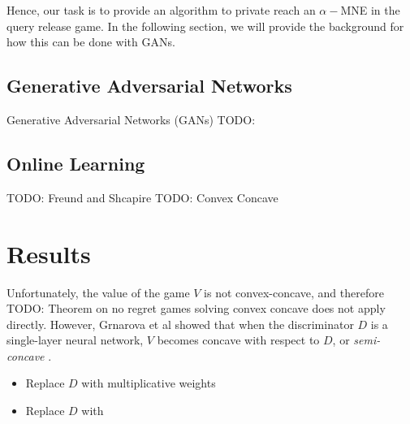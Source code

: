 \documentclass[]{article}
\newcommand{\todo}[1]{}
\renewcommand{\todo}[1]{{\color{red} TODO: {#1}}}
\begin{document}
Hence, our task is to provide an algorithm to private reach an $\alpha-$MNE in the query release game. In the following section, we will provide the background for how this can be done with GANs.

\subsection{Generative Adversarial Networks}

Generative Adversarial Networks (GANs) \todo{}


\subsection{Online Learning}

\todo{Freund and Shcapire}
\todo{Convex Concave}

\section{Results}

    Unfortunately, the value of the game $V$ is not convex-concave, and therefore \todo{Theorem on no regret games solving convex concave} does not apply directly. However, Grnarova et al showed that when the discriminator $D$ is a single-layer neural network, $V$ becomes concave with respect to $D$, or \emph{semi-concave} \cite{GLL+17}. 


\begin{itemize}
    \item Replace $D$ with multiplicative weights
    \item Replace $D$ with 
\end{itemize}





\newpage

\appendix
\end{document}
